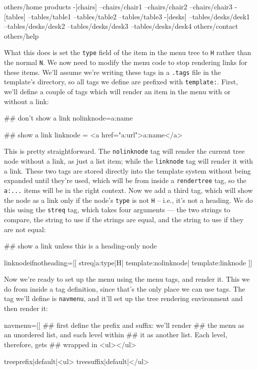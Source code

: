 \begin{MyVerbatim}
others/home
products
-[chairs]
--chairs/chair1
--chairs/chair2
--chairs/chair3
-[tables]
--tables/table1
--tables/table2
--tables/table3
-[desks]
--tables/desks/desk1
--tables/desks/desk2
--tables/desks/desk3
--tables/desks/desk4
others/contact
others/help
\end{MyVerbatim}
What this does is set the \texttt{type} field of the item in the menu tree to
\texttt{H} rather than the normal \texttt{N}. We now need to modify the menu
code to stop rendering links for these items.
We'll assume we're writing these tags in a \texttt{.tags} file in the template's
directory, so all tags we define are prefixed with \texttt{template:}. First,
we'll define a couple of tags which will render an item in the menu with or
without a link:
\begin{MyVerbatim}
## don't show a link
nolinknode={{a:name}}

## show a link
linknode = <a href="{{a:url}}">{{a:name}}</a>
\end{MyVerbatim}
This is pretty straightforward. The \texttt{nolinknode} tag will render the
current tree node without a link, as just a list item; while the
\texttt{linknode} tag will render it with a link. These two tags are stored
directly into the template system without being expanded until they're used,
which will be from inside a \texttt{rendertree} tag, so the \texttt{a:...}
items will be in the right context. Now we add a third tag, which will show
the node as a link only if the node's \texttt{type} is not \texttt{H} -- i.e.,
it's not a heading. We do this using the \texttt{streq} tag, which takes four
\label{strequselab}
arguments --- the two strings to compare, the string to use if the strings are
equal, and the string to use if they are not equal:
\begin{MyVerbatim}
## show a link unless this is a heading-only node

linknodeifnotheading=[[
        {{streq|{{a:type}}|H|
            {{template:nolinknode}}|
            {{template:linknode}}
        }}
]]
\end{MyVerbatim}
Now we're ready to set up the menu using the menu tags, and render it. This we
do from inside a tag definition, since that's the only place we can use tags.
The tag we'll define is \texttt{navmenu}, and it'll set up the tree rendering
environment and then render it:
\begin{MyVerbatim}
navmenu=[[      
    ## first define the prefix and suffix: we'll render
    ## the menu as an unordered list, and each level within
    ## it as another list. Each level, therefore, gets
    ## wrapped in <ul></ul>

    {{treeprefix|default|<ul>}}
    {{treesuffix|default|</ul>}}
\end{MyVerbatim}
